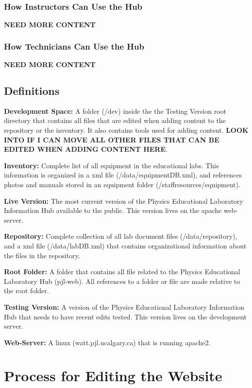 \documentclass[justified]{pjlProcessDocs}
\begin{document}
\subsection{How Instructors Can Use the Hub}

{\bf NEED MORE CONTENT}


\subsection{How Technicians Can Use the Hub}

{\bf NEED MORE CONTENT}

\section{Definitions}\label{sec:definitions}

{\bf Development Space:} A folder (/dev) inside the the Testing Version root directory that contains all files that are edited when adding content to the repository or the inventory. It also contains tools used for adding content. {\bf LOOK INTO IF I CAN MOVE ALL OTHER FILES THAT CAN BE EDITED WHEN ADDING CONTENT HERE}.

{\bf Inventory:} Complete list of all equipment in the educational labs. This information is organized in a xml file (/data/equipmentDB.xml), and references photos and manuals stored in an equipment folder (/staffresources/equipment). 

{\bf Live Version:} The most current version of the Physics Educational Laboratory Information Hub available to the public. This version lives on the apache web-server. 

{\bf Repository:} Complete collection of all lab document files (/data/repository), and a xml file (/data/labDB.xml) that contains organizational information about the files in the repository.

{\bf Root Folder:} A folder that contains all file related to the Physics Educational Laboratory Hub (pjl-web). All references to a folder or file are made relative to the root folder.

{\bf Testing Version:} A version of the Physics Educational Laboratory Information Hub that needs to have recent edits tested. This version lives on the development server. 

{\bf Web-Server:} A linux (watt.pjl.ucalgary.ca) that is running apache2.

\chapter{Process for Editing the Website}
\end{document}
